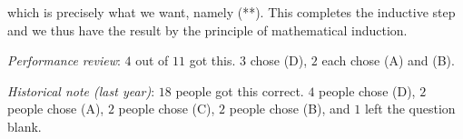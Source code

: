 \documentclass[10pt]{amsart}
\begin{document}
\begin{enumerate}
    which is precisely what we want, namely (**). This completes the
    inductive step and we thus have the result by the principle of
    mathematical induction.

    {\em Performance review}: $4$ out of $11$ got this. $3$ chose (D),
    $2$ each chose (A) and (B).

    {\em Historical note (last year)}: $18$ people got this correct. $4$
    people chose (D), $2$ people chose (A), $2$ people chose (C), $2$
    people chose (B), and $1$ left the question blank.
\end{enumerate}
\end{document}
